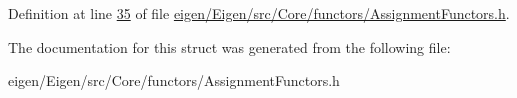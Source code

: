 Definition at line \hyperlink{eigen_2_eigen_2src_2_core_2functors_2_assignment_functors_8h_source_l00035}{35} of file \hyperlink{eigen_2_eigen_2src_2_core_2functors_2_assignment_functors_8h_source}{eigen/\+Eigen/src/\+Core/functors/\+Assignment\+Functors.\+h}.



The documentation for this struct was generated from the following file\+:\begin{DoxyCompactItemize}
\item 
eigen/\+Eigen/src/\+Core/functors/\+Assignment\+Functors.\+h\end{DoxyCompactItemize}
